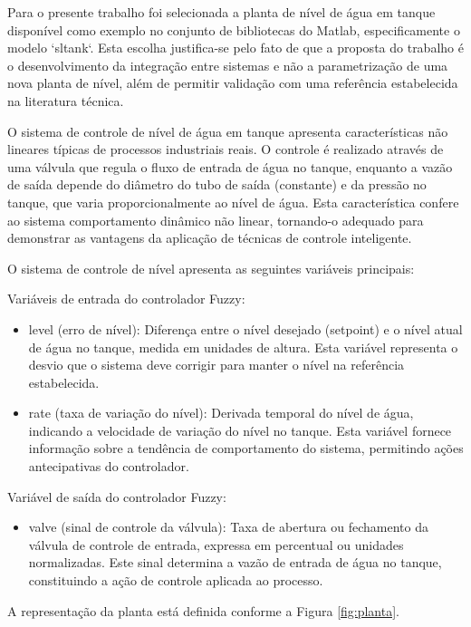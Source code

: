 Para o presente trabalho foi selecionada a planta de nível de água em tanque disponível como exemplo no conjunto de bibliotecas do Matlab, especificamente o modelo `sltank`. Esta escolha justifica-se pelo fato de que a proposta do trabalho é o desenvolvimento da integração entre sistemas e não a parametrização de uma nova planta de nível, além de permitir validação com uma referência estabelecida na literatura técnica.

O sistema de controle de nível de água em tanque apresenta características não lineares típicas de processos industriais reais. O controle é realizado através de uma válvula que regula o fluxo de entrada de água no tanque, enquanto a vazão de saída depende do diâmetro do tubo de saída (constante) e da pressão no tanque, que varia proporcionalmente ao nível de água. Esta característica confere ao sistema comportamento dinâmico não linear, tornando-o adequado para demonstrar as vantagens da aplicação de técnicas de controle inteligente.

O sistema de controle de nível apresenta as seguintes variáveis principais:

Variáveis de entrada do controlador Fuzzy:

\begin{itemize}
\item level (erro de nível): Diferença entre o nível desejado (setpoint) e o nível atual de água no tanque, medida em unidades de altura. Esta variável representa o desvio que o sistema deve corrigir para manter o nível na referência estabelecida.
\item rate (taxa de variação do nível): Derivada temporal do nível de água, indicando a velocidade de variação do nível no tanque. Esta variável fornece informação sobre a tendência de comportamento do sistema, permitindo ações antecipativas do controlador.
\end{itemize}

Variável de saída do controlador Fuzzy:

\begin{itemize}
\item valve (sinal de controle da válvula): Taxa de abertura ou fechamento da válvula de controle de entrada, expressa em percentual ou unidades normalizadas. Este sinal determina a vazão de entrada de água no tanque, constituindo a ação de controle aplicada ao processo.
\end{itemize}

A representação da planta está definida conforme a Figura \ref{fig:planta}.

